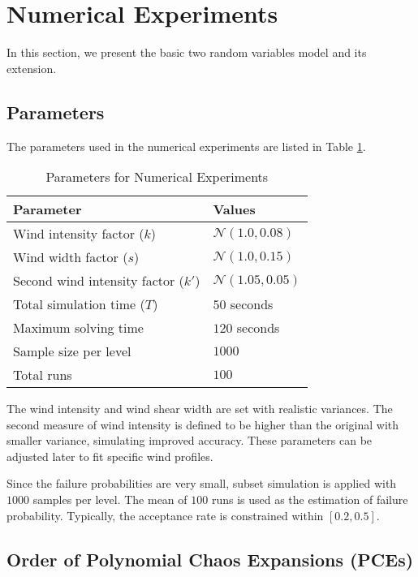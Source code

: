 \section{Numerical Experiments}
In this section, we present the basic two random variables model and its extension.

\subsection{Parameters}

The parameters used in the numerical experiments are listed in Table \ref{tab:parameters}.

\begin{table}[h!]
    \centering
    \begin{tabular}{ll}
        \toprule
        \textbf{Parameter} & \textbf{Values} \\
        \midrule
        Wind intensity factor ($k$) & $\mathcal{N}(1.0, 0.08)$ \\
        Wind width factor ($s$) & $\mathcal{N}(1.0, 0.15)$ \\
        Second wind intensity factor ($k'$) & $\mathcal{N}(1.05, 0.05)$ \\
        Total simulation time ($T$) & $50$ seconds \\
        Maximum solving time & $120$ seconds \\
        Sample size per level & $1000$ \\
        Total runs & $100$ \\
        \bottomrule
    \end{tabular}
    \caption{Parameters for Numerical Experiments}
    \label{tab:parameters}
\end{table}

The wind intensity and wind shear width are set with realistic variances. The second measure of wind intensity is defined to be higher than the original with smaller variance, simulating improved accuracy. These parameters can be adjusted later to fit specific wind profiles.

Since the failure probabilities are very small, subset simulation \cite{hd_ss} is applied with $1000$ samples per level. The mean of $100$ runs is used as the estimation of failure probability. Typically, the acceptance rate is constrained within $[0.2, 0.5]$.

\subsection{Order of Polynomial Chaos Expansions (PCEs)}

